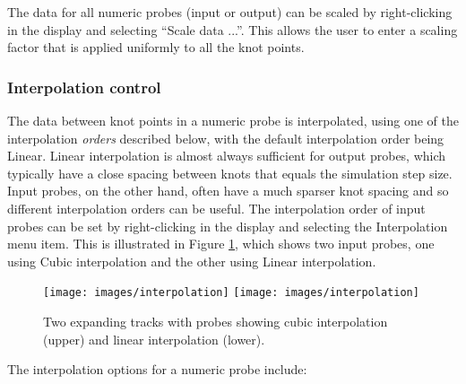 \documentclass{article}
\begin{document}
The data for all numeric probes (input or output) can be scaled by
right-clicking in the display and selecting {\sf ``Scale data ...''}.
This allows the user to enter a scaling factor that is applied
uniformly to all the knot points.

\subsubsection{Interpolation control}
\label{interpolation:sec}

The data between knot points in a numeric probe is interpolated, using
one of the interpolation {\it orders} described below, with the
default interpolation order being {\sf Linear}. Linear interpolation
is almost always sufficient for output probes, which typically have a
close spacing between knots that equals the simulation step
size. Input probes, on the other hand, often have a much sparser knot
spacing and so different interpolation orders can be useful.  The
interpolation order of input probes can be set by right-clicking in
the display and selecting the {\sf Interpolation} menu item.  This is
illustrated in Figure \ref{interpolationFig}, which shows two input
probes, one using {\sf Cubic} interpolation and the other using {\sf
Linear} interpolation.

\begin{figure}
\begin{center}
\iflatexml
\texttt{[image: images/interpolation]}
\else
\texttt{[image: images/interpolation]}
\fi
\end{center}
\caption{Two expanding tracks with probes showing
cubic interpolation (upper) and linear interpolation (lower).}%
\label{interpolationFig}
\end{figure}

The interpolation options for a numeric probe include:
\end{document}
